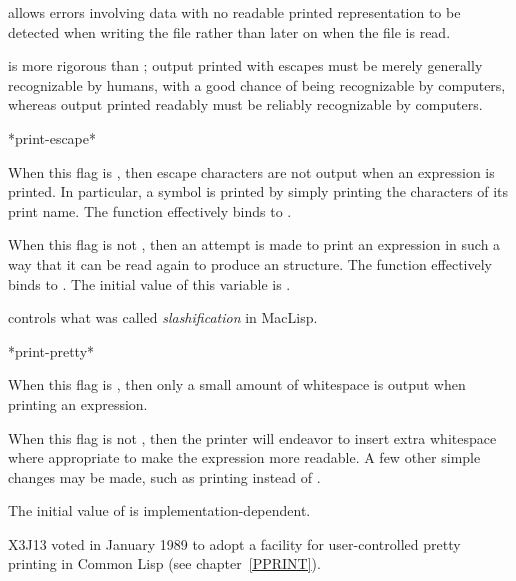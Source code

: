 \begin{newer}
\begin{defun}[Variable]
   allows errors involving data with no
  readable printed representation to be detected when writing the file rather than
  later on when the file is read.

   is more rigorous than ; output printed
  with escapes must be merely generally recognizable by humans, with a good chance
  of being recognizable by computers, whereas
  output printed readably must be reliably recognizable by computers.
\end{defun}
\end{newer}

\begin{defun}[Variable]
*print-escape*

When this flag is {\false}, then escape characters are not output
when an expression is printed.  In particular, a symbol is printed
by simply printing the characters of its print name.
The function  effectively binds  to {\false}.

When this flag is not {\false}, then an attempt is made to print an
expression in such a way that it can be read again to produce an
 structure.
The function  effectively binds  to {\true}.
The initial value of this variable is {\true}.

\beforenoterule
\begin{incompatibility}
 controls what was called \emph{slashification}
in MacLisp.
\end{incompatibility}
\afternoterule
\end{defun}

\begin{defun}[Variable]
*print-pretty*

When this flag is {\false}, then only a small amount of whitespace is
output when printing an expression.

When this flag is not {\false}, then the printer will endeavor to insert
extra whitespace where appropriate to make the expression more readable.
A few other simple changes may be made, such as printing 
instead of .

The initial value of  is implementation-dependent.

\begin{new}
X3J13 voted in January 1989
to adopt a facility for user-controlled pretty printing
in Common Lisp
(see chapter~\ref{PPRINT}).
\end{new}
\end{defun}

